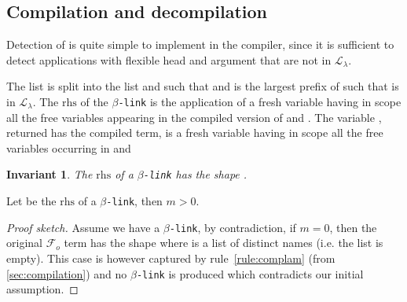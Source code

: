 \documentclass[sigconf,natbib=false,review]{acmart}
\newtheorem{invariant}{Invariant}
\newcommand{\appsep}{\ensuremath{\textcolor{lightgray}{\cdot}}}
\newcommand{\llambda}{\ensuremath{\mathcal{L}_\lambda}\xspace}
\newcommand{\linkMacro}[1]{\ensuremath{#1}\texttt{-link}\xspace}
\newcommand{\linkbeta}{\linkMacro{\beta}}
\newcommand{\Fo}{\ensuremath{\mathcal{F}_{\!o}\xspace}} %
\newcommand{\linkbetaM}[3]{\ensuremath{#1 \vdash #2 =_\beta #3}}
\newcommand{\rhs}{\ensuremath{\mathrm{rhs}}\xspace}
\newcommand{\linkStore}{\ensuremath{\mathbb{L}}\xspace}
\begin{document}


\subsection{Compilation and decompilation}

Detection of \notllambda is quite simple to implement in the compiler, since it
is sufficient to detect applications with flexible head and argument that
are not in \llambda.



The list  is split into the list  and  such
that  and  is the largest prefix of
 such that  is in \llambda. The \rhs of the \linkbeta is
the application of a fresh variable  having in scope all the free
variables appearing in the compiled version of  and . The
variable , returned has the compiled term, is a fresh variable having in
scope all the free variables occurring in  and 


\begin{invariant}
  The \rhs of a \linkbeta has the shape \rhsBeta.
\end{invariant}

\begin{corollary}
  Let \rhsBeta be the \rhs of a \linkbeta, then $m > 0$.
\end{corollary}

\begin{proof}[Proof sketch]
  Assume we have a \linkbeta, by contradiction, if $m = 0$, then the original
  \Fo{} term has the shape  where  is a
  list of distinct names (i.e. the list  is empty). This case is
  however captured by rule~\ref{rule:complam} (from \cref{sec:compilation}) and
  no \linkbeta is produced which contradicts our initial assumption.
\end{proof}
\end{document}
